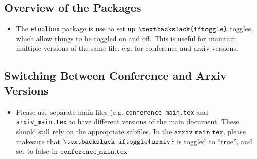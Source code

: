 
\subsection{Overview of the Packages}
\begin{itemize}
    \item The \texttt{etoolbox} package is use to set up $\texttt{\textbackslack{iftoggle}}$ toggles, which allow things to be toggled on and off. This is useful for maintain multiple versions of the same file, e.g. for conference and arxiv versions. 
\end{itemize}
\subsection{Switching Between Conference and Arxiv Versions}
\begin{itemize}
    \item Please use separate main files (e.g. \texttt{conference\_main.tex} and \texttt{arxiv\_main.tex} to have different versions of the main document. These should still rely on the appropriate subfiles. In the $\texttt{arxiv\_main.tex}$, please makesure that $\texttt{\textbackslack iftoggle\{arxiv\}}$ is toggled to ``true'', and set to false in $\texttt{conference\_main.tex}$
\end{itemize}